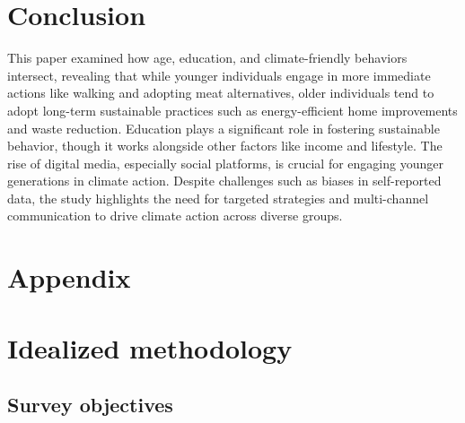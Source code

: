 \documentclass[
  letterpaper,
  DIV=11,
  numbers=noendperiod]{scrartcl}
\begin{document}
\section{Conclusion}\label{sec-conclusion}

This paper examined how age, education, and climate-friendly behaviors
intersect, revealing that while younger individuals engage in more
immediate actions like walking and adopting meat alternatives, older
individuals tend to adopt long-term sustainable practices such as
energy-efficient home improvements and waste reduction. Education plays
a significant role in fostering sustainable behavior, though it works
alongside other factors like income and lifestyle. The rise of digital
media, especially social platforms, is crucial for engaging younger
generations in climate action. Despite challenges such as biases in
self-reported data, the study highlights the need for targeted
strategies and multi-channel communication to drive climate action
across diverse groups.

\newpage

\appendix

\section{Appendix}\label{sec-appendix}

\section{Idealized methodology}\label{sec-idealized-meth}

\subsection{Survey objectives}\label{survey-objectives}
\end{document}
